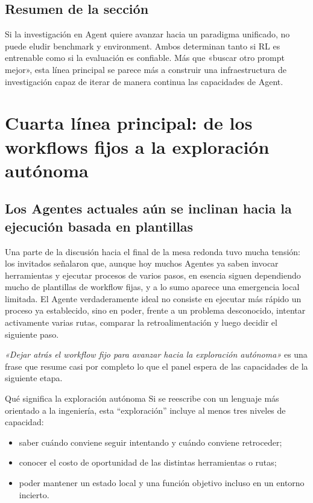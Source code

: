 \documentclass[a4paper]{article}
\begin{document}
\subsection{Resumen de la sección}
Si la investigación en Agent quiere avanzar hacia un paradigma unificado, no puede eludir benchmark y environment. Ambos determinan tanto si RL es entrenable como si la evaluación es confiable. Más que «buscar otro prompt mejor», esta línea principal se parece más a construir una infraestructura de investigación capaz de iterar de manera continua las capacidades de Agent.

\section{Cuarta línea principal: de los workflows fijos a la exploración autónoma}

\subsection{Los Agentes actuales aún se inclinan hacia la ejecución basada en plantillas}
Una parte de la discusión hacia el final de la mesa redonda tuvo mucha tensión: los invitados señalaron que, aunque hoy muchos Agentes ya saben invocar herramientas y ejecutar procesos de varios pasos, en esencia siguen dependiendo mucho de plantillas de workflow fijas, y a lo sumo aparece una emergencia local limitada. El Agente verdaderamente ideal no consiste en ejecutar más rápido un proceso ya establecido, sino en poder, frente a un problema desconocido, intentar activamente varias rutas, comparar la retroalimentación y luego decidir el siguiente paso.

\textit{«Dejar atrás el workflow fijo para avanzar hacia la exploración autónoma»} es una frase que resume casi por completo lo que el panel espera de las capacidades de la siguiente etapa.

\begin{importantbox}{Qué significa la exploración autónoma}
Si se reescribe con un lenguaje más orientado a la ingeniería, esta ``exploración'' incluye al menos tres niveles de capacidad:
\begin{itemize}
  \item saber cuándo conviene seguir intentando y cuándo conviene retroceder;
  \item conocer el costo de oportunidad de las distintas herramientas o rutas;
  \item poder mantener un estado local y una función objetivo incluso en un entorno incierto.
\end{itemize}
\end{importantbox}
\end{document}
